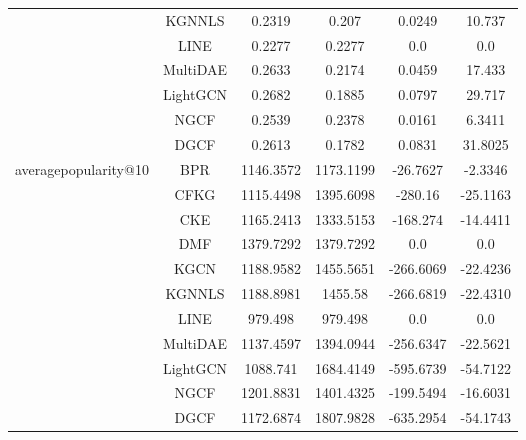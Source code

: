 \begin{table}[H]
{\begin{tabular}{|c|c|c|c|c|c|}
                                       & KGNNLS & 0.2319 & 0.207 & 0.0249 & 10.737 \\ \cline{2-6}
                                       & LINE & 0.2277 & 0.2277 & 0.0 & 0.0 \\ \cline{2-6}
                                       & MultiDAE & 0.2633 & 0.2174 & 0.0459 & 17.433 \\ \cline{2-6}
                                       & LightGCN & 0.2682 & 0.1885 & 0.0797 & 29.717 \\ \cline{2-6}
                                       & NGCF & 0.2539 & 0.2378 & 0.0161 & 6.3411 \\ \cline{2-6}
                                       & DGCF & 0.2613 & 0.1782 & 0.0831 & 31.8025 \\ \cline{2-6}
            \hline
            \multirow{11}{*}{averagepopularity@10} & BPR & 1146.3572 & 1173.1199 & -26.7627 & -2.3346 \\ \cline{2-6}
                                                    & CFKG & 1115.4498 & 1395.6098 & -280.16 & -25.1163 \\ \cline{2-6}
                                                    & CKE & 1165.2413 & 1333.5153 & -168.274 & -14.4411 \\ \cline{2-6}
                                                    & DMF & 1379.7292 & 1379.7292 & 0.0 & 0.0 \\ \cline{2-6}
                                                    & KGCN & 1188.9582 & 1455.5651 & -266.6069 & -22.4236 \\ \cline{2-6}
                                                    & KGNNLS & 1188.8981 & 1455.58 & -266.6819 & -22.4310 \\ \cline{2-6}
                                                    & LINE & 979.498 & 979.498 & 0.0 & 0.0 \\ \cline{2-6}
                                                    & MultiDAE & 1137.4597 & 1394.0944 & -256.6347 & -22.5621 \\ \cline{2-6}
                                                    & LightGCN & 1088.741 & 1684.4149 & -595.6739 & -54.7122 \\ \cline{2-6}
                                                    & NGCF & 1201.8831 & 1401.4325 & -199.5494 & -16.6031 \\ \cline{2-6}
                                                    & DGCF & 1172.6874 & 1807.9828 & -635.2954 & -54.1743 \\ \cline{2-6}
            \hline

\end{tabular}}
\end{table}

